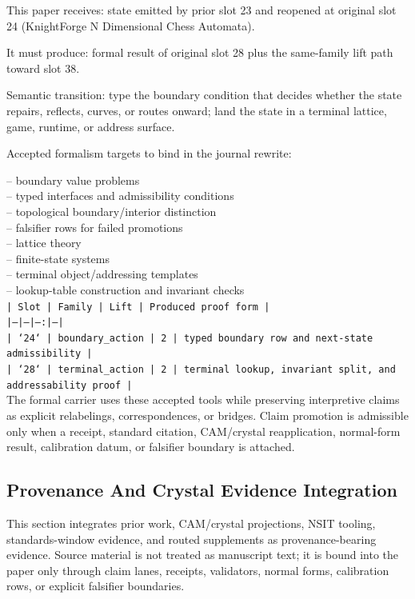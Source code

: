 \documentclass[11pt]{article}
\begin{document}
This paper receives: state emitted by prior slot 23 and reopened at original slot 24 (KnightForge N Dimensional Chess Automata).

It must produce: formal result of original slot 28 plus the same-family lift path toward slot 38.

Semantic transition: type the boundary condition that decides whether the state repairs, reflects, curves, or routes onward; land the state in a terminal lattice, game, runtime, or address surface.

Accepted formalism targets to bind in the journal rewrite:

\noindent{}-- boundary value problems\\
\noindent{}-- typed interfaces and admissibility conditions\\
\noindent{}-- topological boundary/interior distinction\\
\noindent{}-- falsifier rows for failed promotions\\
\noindent{}-- lattice theory\\
\noindent{}-- finite-state systems\\
\noindent{}-- terminal object/addressing templates\\
\noindent{}-- lookup-table construction and invariant checks\\

\noindent\texttt{| Slot | Family | Lift | Produced proof form |}\\
\noindent\texttt{|---|---|---:|---|}\\
\noindent\texttt{| `24` | boundary\_action | 2 | typed boundary row and next-state admissibility |}\\
\noindent\texttt{| `28` | terminal\_action | 2 | terminal lookup, invariant split, and addressability proof |}\\

The formal carrier uses these accepted tools while preserving interpretive
claims as explicit relabelings, correspondences, or bridges. Claim promotion is admissible only when a receipt, standard citation,
CAM/crystal reapplication, normal-form result, calibration datum, or falsifier
boundary is attached.

\subsection*{Provenance And Crystal Evidence Integration}

This section integrates prior work, CAM/crystal projections, NSIT tooling,
standards-window evidence, and routed supplements as provenance-bearing
evidence. Source material is not treated as manuscript text; it is bound into
the paper only through claim lanes, receipts, validators, normal forms,
calibration rows, or explicit falsifier boundaries.
\end{document}

